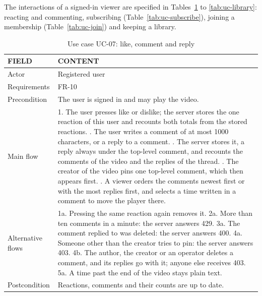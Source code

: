 The interactions of a signed-in viewer are specified in Tables~\ref{tab:uc-interact} to
\ref{tab:uc-library}: reacting and commenting, subscribing (Table~\ref{tab:uc-subscribe}), joining a
membership (Table~\ref{tab:uc-join}) and keeping a library.

\begin{table}[H]
\centering
\caption{Use case UC-07: like, comment and reply}
\label{tab:uc-interact}
\small
\begin{tabularx}{\textwidth}{p{} X}
\toprule
\textbf{FIELD} & \textbf{CONTENT} \\
\midrule
Actor & Registered user \\
Requirements & FR-10 \\
Precondition & The user is signed in and may play the video. \\
Main flow &
  1. The user presses like or dislike; the server stores the one reaction of this user and recounts both totals from the stored reactions. \newline
  2. The user writes a comment of at most 1000 characters, or a reply to a comment. \newline
  3. The server stores it, a reply always under the top-level comment, and recounts the comments of the video and the replies of the thread. \newline
  4. The creator of the video pins one top-level comment, which then appears first. \newline
  5. A viewer orders the comments newest first or with the most replies first, and selects a time written in a comment to move the player there. \\
Alternative flows &
  1a. Pressing the same reaction again removes it. \newline
  2a. More than ten comments in a minute: the server answers 429. \newline
  3a. The comment replied to was deleted: the server answers 400. \newline
  4a. Someone other than the creator tries to pin: the server answers 403. \newline
  4b. The author, the creator or an operator deletes a comment, and its replies go with it; anyone else receives 403. \newline
  5a. A time past the end of the video stays plain text. \\
Postcondition & Reactions, comments and their counts are up to date. \\
\bottomrule
\end{tabularx}
\end{table}

